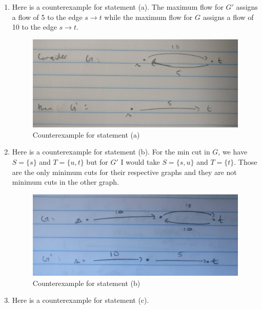 \documentclass{article}
\begin{document}
\begin{enumerate}[label=(\alph*)]
    \item Here is a counterexample for statement (a).
    The maximum flow for $G'$ assigns a flow of 5 to the edge $s \to t$ while the maximum flow for $G$ assigns a flow of 10 to the edge $s \to t$.
        \begin{figure}[h]
        \begin{center}
            \includegraphics[scale=0.19]{img/7-4-a}
            \caption{Counterexample for statement (a)}
            \label{fig:7-4-a}
        \end{center}
        \end{figure}
    \newpage
    \item Here is a counterexample for statement (b).
    For the min cut in $G$, we have $S = \{ s \} $ and $T = \{ u, t \} $ but for $G'$ I would take $S = \{ s, u \} $ and $T = \{ t \}$.
    Those are the only minimum cuts for their respective graphs and they are not minimum cuts in the other graph.
        \begin{figure}[h]
        \begin{center}
            \includegraphics[scale=0.08,angle=90]{img/7-4-b}
            \caption{Counterexample for statement (b)}
            \label{fig:7-4-b}
        \end{center}
        \end{figure}
    \item Here is a counterexample for statement (c).

\end{enumerate}
\end{document}
